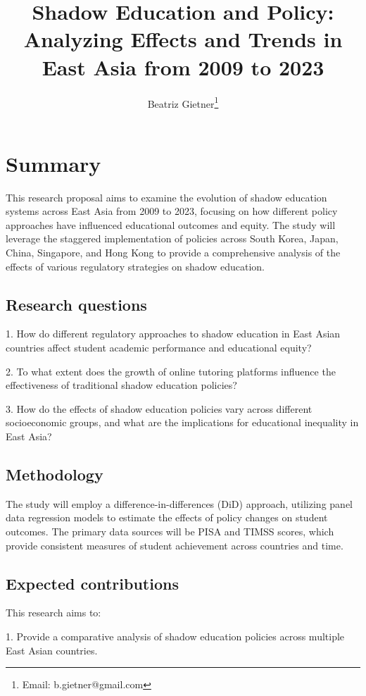 \documentclass[12pt,a4paper,onecolumn]{article}
\title{\vspace{-2cm}\Large\textbf{Shadow Education and Policy: Analyzing Effects and Trends in East Asia from 2009 to 2023}}
\author[]{Beatriz Gietner\thanks{Email: b.gietner@gmail.com}}
\affil{University College Dublin}
\date{}
\numberwithin{equation}{section}
\begin{document}
\maketitle

\section{Summary}

This research proposal aims to examine the evolution of shadow education systems across East Asia from 2009 to 2023, focusing on how different policy approaches have influenced educational outcomes and equity. The study will leverage the staggered implementation of policies across South Korea, Japan, China, Singapore, and Hong Kong to provide a comprehensive analysis of the effects of various regulatory strategies on shadow education.

\subsection{Research questions}
1. How do different regulatory approaches to shadow education in East Asian countries affect student academic performance and educational equity?

2. To what extent does the growth of online tutoring platforms influence the effectiveness of traditional shadow education policies?

3. How do the effects of shadow education policies vary across different socioeconomic groups, and what are the implications for educational inequality in East Asia?

\subsection{Methodology}

The study will employ a difference-in-differences (DiD) approach, utilizing panel data regression models to estimate the effects of policy changes on student outcomes. The primary data sources will be PISA and TIMSS scores, which provide consistent measures of student achievement across countries and time.

\subsection{Expected contributions}
This research aims to:

1. Provide a comparative analysis of shadow education policies across multiple East Asian countries.
\end{document}
